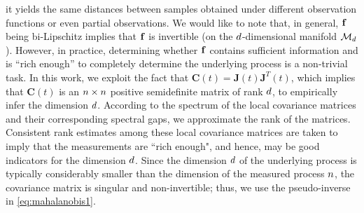 it yields the same distances between samples obtained under different observation functions or even partial observations.
%
We would like to note that, in general, $\mathbf{f}$ being bi-Lipschitz implies that $\mathbf{f}$ is invertible (on the $d$-dimensional
manifold $\mathcal{M}_d$).
%
However, in practice, determining whether $\mathbf{f}$ contains sufficient information and is ``rich enough'' to completely determine the underlying process is a non-trivial task.
%
In this work, we exploit the fact that $\mathbf{C}(t) = \mathbf{J}(t)\mathbf{J}^T(t)$, which implies that $\mathbf{C}(t)$ is an $n \times n$ positive semidefinite matrix of rank $d$, to empirically infer the dimension $d$.
%
According to the spectrum of the local covariance matrices and their corresponding spectral gaps, we approximate the rank of the matrices.
%
Consistent rank estimates among these local covariance matrices are taken to imply that the measurements are ``rich enough", and hence, may be good indicators for the dimension $d$.
%
Since the dimension $d$ of the underlying process is typically considerably smaller than the dimension of the measured process $n$,
the covariance matrix is singular and non-invertible;
%
thus, we use the pseudo-inverse in \eqref{eq:mahalanobis1}.


